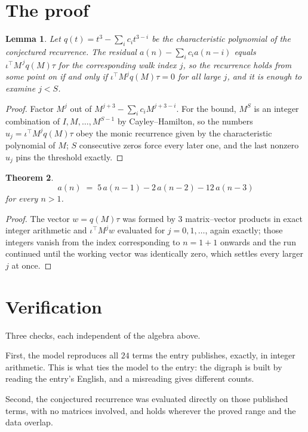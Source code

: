 \documentclass[11pt,a4paper]{article}
\theoremstyle{plain}
\newtheorem{theorem}{Theorem}
\newtheorem{lemma}[theorem]{Lemma}
\theoremstyle{definition}
\begin{document}
\section{The proof}

\begin{lemma}\label{lem:crit}
Let $q(t)=t^{3}-\sum_i c_it^{3-i}$ be the characteristic polynomial of the
conjectured recurrence. The residual $a(n)-\sum_ic_ia(n-i)$ equals
$\iota^{\!\top}M^{\,j}q(M)\tau$ for the corresponding walk index $j$, so the recurrence
holds from some point on if and only if $\iota^{\!\top}M^{j}q(M)\tau=0$ for all large $j$,
and it is enough to examine $j<S$.
\end{lemma}

\begin{proof}
Factor $M^{j}$ out of $M^{j+3}-\sum_ic_iM^{j+3-i}$. For the bound, $M^{S}$
is an integer combination of $I,M,\dots,M^{S-1}$ by Cayley--Hamilton, so the numbers
$u_j=\iota^{\!\top}M^{j}q(M)\tau$ obey the monic recurrence given by the characteristic
polynomial of $M$; $S$ consecutive zeros force every later one, and the last nonzero $u_j$
pins the threshold exactly.
\end{proof}

\begin{theorem}
\[
a(n)\;=\;5\,a(n-1) - 2\,a(n-2) - 12\,a(n-3)
\]
for every $n>1$.
\end{theorem}

\begin{proof}
The vector $w=q(M)\tau$ was formed by $3$ matrix--vector products in exact integer
arithmetic and $\iota^{\!\top}M^{j}w$ evaluated for $j=0,1,\dots$, again exactly; those
integers vanish from the index corresponding to $n=1+1$ onwards and the run continued
until the working vector was identically zero, which settles every larger $j$ at once.
\end{proof}

\section{Verification}

Three checks, each independent of the algebra above.

First, the model reproduces all $24$ terms the entry publishes, exactly, in integer
arithmetic. This is what ties the model to the entry: the digraph is built by reading the
entry's English, and a misreading gives different counts.

Second, the conjectured recurrence was evaluated directly on those published terms, with no
matrices involved, and holds wherever the proved range and the data overlap.
\end{document}
